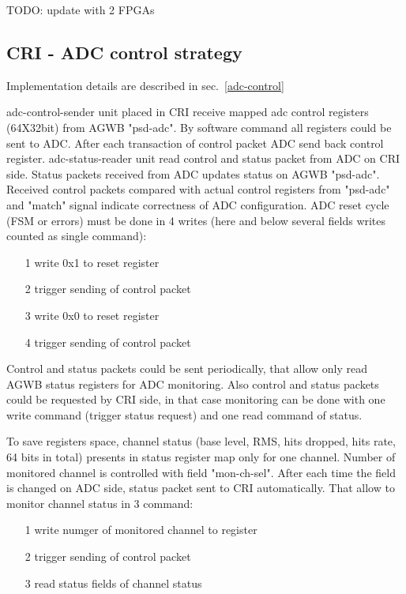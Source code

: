 \documentclass{article}
\begin{document}
TODO: update with 2 FPGAs




\subsection{CRI - ADC control strategy}\label{cri-adc-ctrl-desc}
Implementation details are described in sec.~\ref{adc-control}

adc-control-sender unit placed in CRI receive mapped adc control registers (64X32bit) from AGWB "psd-adc". By software command all registers could be sent to ADC. After each transaction of control packet ADC send back control register. adc-status-reader unit read control and status packet from ADC on CRI side. Status packets received from ADC updates status on AGWB "psd-adc". Received control packets compared with actual control registers from "psd-adc" and "match" signal indicate correctness of ADC configuration.
ADC reset cycle (FSM or errors) must be done in 4 writes (here and below several fields writes counted as single command):

\begin{itemize}
\item[1] write 0x1 to reset register
\item[2] trigger sending of control packet
\item[3] write 0x0 to reset register
\item[4] trigger sending of control packet
\end{itemize}

Control and status packets could be sent periodically, that allow only read AGWB status registers for ADC monitoring. Also control and status packets could be requested by CRI side, in that case monitoring can be done with one write command (trigger status request) and one read command of status. 

To save registers space, channel status (base level, RMS, hits dropped, hits rate, 64 bits in total) presents in status register map only for one channel. Number of monitored channel is controlled with field "mon-ch-sel". After each time the field is changed on ADC side, status packet sent to CRI automatically. That allow to monitor channel status in 3 command:

\begin{itemize}
\item[1] write numger of monitored channel to register
\item[2] trigger sending of control packet
\item[3] read status fields of channel status
\end{itemize}
\end{document}
